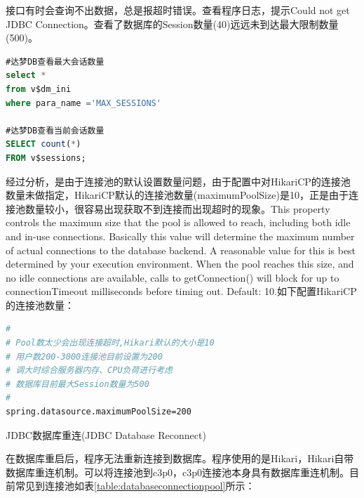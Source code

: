 \documentclass[12pt]{book}
\makeatletter
\numberwithin{dummy}{section}
\theoremstyle{ocrenumbox}
\theoremstyle{blacknumex}
\theoremstyle{blacknumbox}
\theoremstyle{ocrenum}
\renewcommand{\subsection}{\@startsection {subsection}{2}{\z@}
	{-3ex \@plus -0.1ex \@minus -.4ex}
	{0.5ex \@plus.2ex }
	{\normalfont\sffamily\bfseries}}
\makeatother
\begin{document}
接口有时会查询不出数据，总是报超时错误。查看程序日志，提示Could not get JDBC Connection。查看了数据库的Session数量(40)远远未到达最大限制数量(500)。

\begin{lstlisting}[language=SQL]
#达梦DB查看最大会话数量
select *
from v$dm_ini
where para_name ='MAX_SESSIONS'

#达梦DB查看当前会话数量
SELECT count(*)
FROM v$sessions;
\end{lstlisting}

经过分析，是由于连接池的默认设置数量问题，由于配置中对HikariCP的连接池数量未做指定，HikariCP默认的连接池数量(maximumPoolSize)是10，正是由于连接池数量较小，很容易出现获取不到连接而出现超时的现象。This property controls the maximum size that the pool is allowed to reach, including both idle and in-use connections. Basically this value will determine the maximum number of actual connections to the database backend. A reasonable value for this is best determined by your execution environment. When the pool reaches this size, and no idle connections are available, calls to getConnection() will block for up to connectionTimeout milliseconds before timing out. Default: 10.如下配置HikariCP的连接池数量：

\begin{lstlisting}[language=Bash]
#
# Pool数太少会出现连接超时,Hikari默认的大小是10
# 用户数200-3000连接池目前设置为200
# 调大时综合服务器内存、CPU负荷进行考虑
# 数据库目前最大Session数量为500
#
spring.datasource.maximumPoolSize=200
\end{lstlisting}


\subsection{JDBC数据库重连(JDBC Database Reconnect)}

在数据库重启后，程序无法重新连接到数据库。程序使用的是Hikari，Hikari自带数据库重连机制。可以将连接池到c3p0，c3p0连接池本身具有数据库重连机制。目前常见到连接池如表\ref{table:databaseconnectionpool}所示：
\end{document}

